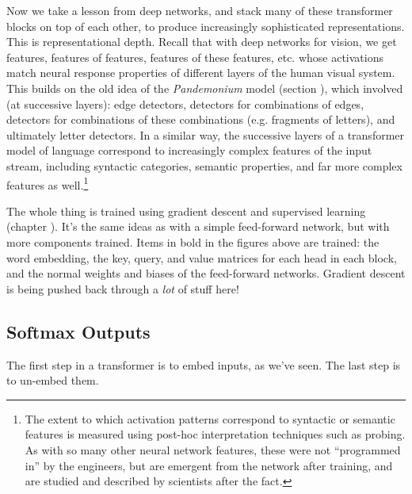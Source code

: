 Now we take a lesson from deep networks, and stack many of these transformer blocks on top of each other, to produce increasingly sophisticated representations. This is representational depth. Recall that with deep networks for vision, we get features, features of features, features of these features, etc. whose activations match neural response properties of different layers of the human visual system. This builds on the old idea of the \emph{Pandemonium} model (section ), which involved (at successive layers): edge detectors, detectors for combinations of edges, detectors for combinations of these combinations (e.g. fragments of letters), and ultimately letter detectors. In a similar way, the successive layers of a transformer model of language correspond to increasingly complex features of the input stream, including syntactic categories, semantic properties, and far more complex features as well.\footnote{The extent to which activation patterns correspond to syntactic or semantic features is measured using post-hoc interpretation techniques such as probing. As with so many other neural network features, these were not ``programmed in'' by the engineers, but are emergent from the network after training, and are studied and described by scientists after the fact.}

The whole thing is trained using gradient descent and supervised learning (chapter ). It's the same ideas as with a simple feed-forward network, but with more components trained. Items in bold in the figures above are trained: the word embedding, the key, query, and value matrices for each head in each block, and the normal weights and biases of the feed-forward networks. Gradient descent is being pushed back through a \emph{lot} of stuff here!

\subsection{Softmax Outputs}\label{llmOutput}

The first step in a transformer is to embed inputs, as we've seen. The last step is to un-embed them. 

